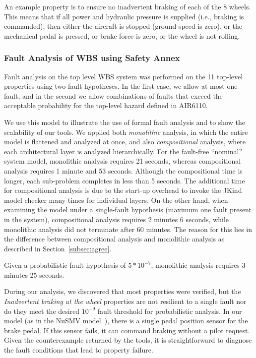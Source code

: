 An example property is to ensure no inadvertent braking of each of the 8 wheels.  This means that if all power and hydraulic pressure is supplied (i.e., braking is commanded), then either the aircraft is stopped (ground speed is zero), or the mechanical pedal is pressed, or brake force is zero, or the wheel is not rolling.


\subsubsection{Fault Analysis of WBS using Safety Annex}

Fault analysis on the top level WBS system was performed on the 11 top-level properties using two fault hypotheses.  In the first case, we allow at most one fault, and in the second we allow combinations of faults that exceed the acceptable probability for the top-level hazard defined in AIR6110.

We use this model to illustrate the use of formal fault analysis and to show the scalability of our tools.  We applied both {\em monolithic} analysis, in which the entire model is flattened and analyzed at once, and also {\em compositional} analysis, where each architectural layer is analyzed hierarchically.
For the fault-free ``nominal'' system model, monolithic analysis requires 21 seconds, whereas compositional analysis requires 1 minute and 53 seconds.  Although the compositional time is longer, each sub-problem completes in less than 5 seconds.  The additional time for compositional analysis is  due to the start-up overhead to invoke the JKind model checker many times for individual layers.  On the other hand, when examining the model under a single-fault hypothesis (maximum one fault present in the system), compositional analysis requires 2 minutes 6 seconds, while monolithic analysis did not terminate after 60 minutes. The reason for this lies in the difference between compositional analysis and monolithic analysis as described in Section~\ref{subsec:agree}. 

Given a probabilistic fault hypothesis of $5*10^{-7}$, monolithic analysis requires 3 minutes 25 seconds.

During our analysis, we discovered that most properties were verified, but the \textit{Inadvertent braking at the wheel} properties are not resilient to a single fault nor do they meet the desired $10^{-9}$ fault threshold for probabilistic analysis.  In our model (as in the NuSMV model~\cite{DBLP:conf/cav/BozzanoCPJKPRT15}), there is a single pedal position sensor for the brake pedal.  If this sensor fails, it can command braking without a pilot request.  Given the counterexample returned by the tools, it is straightforward to diagnose the fault conditions that lead to property failure.

